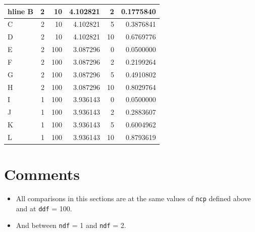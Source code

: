 \documentclass[]{book}
\providecommand{\tightlist}{%
  \setlength{\itemsep}{0pt}\setlength{\parskip}{0pt}}
\begin{document}
\begin{tabular}{l|r|r|r|r|r}
hline
B & 2 & 10 & 4.102821 & 2 & 0.1775840\\
\hline
C & 2 & 10 & 4.102821 & 5 & 0.3876841\\
\hline
D & 2 & 10 & 4.102821 & 10 & 0.6769776\\
\hline
E & 2 & 100 & 3.087296 & 0 & 0.0500000\\
\hline
F & 2 & 100 & 3.087296 & 2 & 0.2199264\\
\hline
G & 2 & 100 & 3.087296 & 5 & 0.4910802\\
\hline
H & 2 & 100 & 3.087296 & 10 & 0.8029764\\
\hline
I & 1 & 100 & 3.936143 & 0 & 0.0500000\\
\hline
J & 1 & 100 & 3.936143 & 2 & 0.2883607\\
\hline
K & 1 & 100 & 3.936143 & 5 & 0.6004962\\
\hline
L & 1 & 100 & 3.936143 & 10 & 0.8793619\\
\hline
\end{tabular}

\hypertarget{comments-2}{%
\section{Comments}\label{comments-2}}

\begin{itemize}
\tightlist
\item
  All comparisons in this sections are at the same values of \texttt{ncp} defined above and at \texttt{ddf} = 100.
\item
  And between \texttt{ndf} = 1 and \texttt{ndf} = 2.
\end{itemize}
\end{document}
